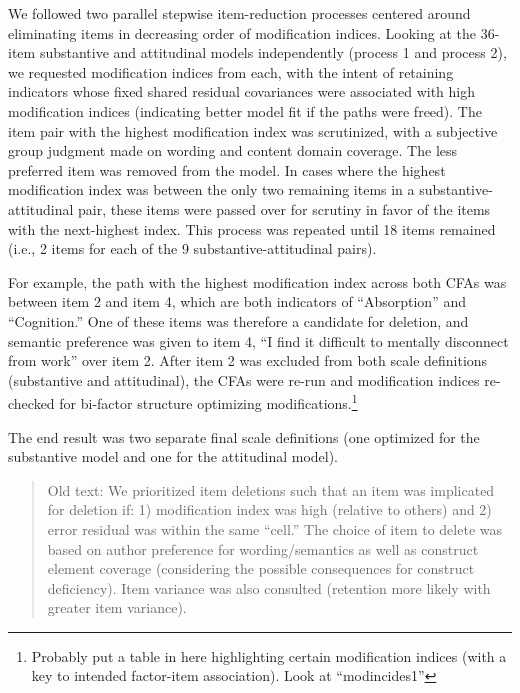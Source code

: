 \documentclass[
  english,
  man]{apa6}
\begin{document}
We followed two parallel stepwise item-reduction processes centered around eliminating items in decreasing order of modification indices. Looking at the 36-item substantive and attitudinal models independently (process 1 and process 2), we requested modification indices from each, with the intent of retaining indicators whose fixed shared residual covariances were associated with high modification indices (indicating better model fit if the paths were freed). The item pair with the highest modification index was scrutinized, with a subjective group judgment made on wording and content domain coverage. The less preferred item was removed from the model. In cases where the highest modification index was between the only two remaining items in a substantive-attitudinal pair, these items were passed over for scrutiny in favor of the items with the next-highest index. This process was repeated until 18 items remained (i.e., 2 items for each of the 9 substantive-attitudinal pairs).

For example, the path with the highest modification index across both CFAs was between item 2 and item 4, which are both indicators of ``Absorption'' and ``Cognition.'' One of these items was therefore a candidate for deletion, and semantic preference was given to item 4, ``I find it difficult to mentally disconnect from work'' over item 2. After item 2 was excluded from both scale definitions (substantive and attitudinal), the CFAs were re-run and modification indices re-checked for bi-factor structure optimizing modifications.\footnote{Probably put a table in here highlighting certain modification indices (with a key to intended factor-item association). Look at ``modincides1''}

The end result was two separate final scale definitions (one optimized for the substantive model and one for the attitudinal model).

\begin{quote}
Old text: We prioritized item deletions such that an item was implicated for deletion if: 1) modification index was high (relative to others) and 2) error residual was within the same ``cell.'' The choice of item to delete was based on author preference for wording/semantics as well as construct element coverage (considering the possible consequences for construct deficiency). Item variance was also consulted (retention more likely with greater item variance).
\end{quote}
\end{document}
